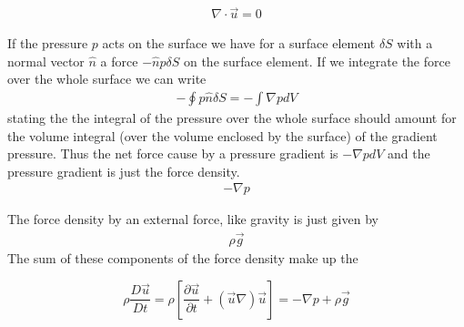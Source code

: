 \documentclass[letterpaper,10pt,english]{sphinxmanual}
\let\sphinxpxdimen\pdfpxdimen\else\newdimen\sphinxpxdimen
\begin{document}
\sphinxAtStartPar
{}
\begin{equation*}
\begin{split}\nabla \cdot \vec{u}=0 \tag{incompressibility}\end{split}
\end{equation*}
\sphinxAtStartPar
{}

\noindent\sphinxincludegraphics[width=1536\sphinxpxdimen,height=422\sphinxpxdimen]{{surface}.png}

\sphinxAtStartPar
If the pressure \(p\) acts on the surface we have for a surface element \(\delta S\) with a normal vector \(\hat{n}\) a force \(-\hat{n}p\delta S\) on the surface element. If we integrate the force over the whole surface we can write
\begin{equation*}
\begin{split}-\oint p\hat{n}\delta S = -\int \nabla p dV\end{split}
\end{equation*}
\sphinxAtStartPar
stating the the integral of the pressure over the whole surface should amount for the volume integral (over the volume enclosed by the surface) of the gradient pressure. Thus the net force cause by a pressure gradient is \(-\nabla p dV\) and the pressure gradient is just the force density.
\begin{equation*}
\begin{split}-\nabla p \tag{pressure force density}\end{split}
\end{equation*}
\sphinxAtStartPar
{}

\sphinxAtStartPar
The force density by an external force, like gravity is just given by
\begin{equation*}
\begin{split}\rho \vec{g} \tag{external force density }\end{split}
\end{equation*}
\sphinxAtStartPar
The sum of these components of the force density make up the 

\sphinxAtStartPar
\begin{equation}
\rho \frac{D\vec{u}}{Dt}=\rho \left [\frac{\partial \vec{u}}{\partial t} +(\vec{u}\nabla)\vec{u}\right ]=-\nabla p + \rho \vec{g} \tag{Euler equation}
\end{equation}
\end{document}
